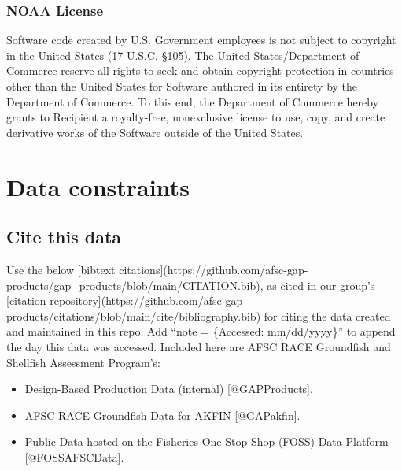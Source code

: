 \documentclass[
  letterpaper,
  oneside,
  open=any]{scrbook}
\begin{document}
\hypertarget{noaa-license}{%
\subsection{NOAA License}\label{noaa-license}}

Software code created by U.S. Government employees is not subject to
copyright in the United States (17 U.S.C. §105). The United
States/Department of Commerce reserve all rights to seek and obtain
copyright protection in countries other than the United States for
Software authored in its entirety by the Department of Commerce. To this
end, the Department of Commerce hereby grants to Recipient a
royalty-free, nonexclusive license to use, copy, and create derivative
works of the Software outside of the United States.

\hypertarget{data-constraints}{%
\chapter{Data constraints}\label{data-constraints}}

\hypertarget{cite-this-data-3}{%
\section{Cite this data}\label{cite-this-data-3}}

Use the below {[}bibtext
citations{]}(https://github.com/afsc-gap-products/gap\_products/blob/main/CITATION.bib),
as cited in our group's {[}citation
repository{]}(https://github.com/afsc-gap-products/citations/blob/main/cite/bibliography.bib)
for citing the data created and maintained in this repo. Add ``note =
\{Accessed: mm/dd/yyyy\}'' to append the day this data was accessed.
Included here are AFSC RACE Groundfish and Shellfish Assessment
Program's:

\begin{itemize}
\item
  Design-Based Production Data (internal) {[}@GAPProducts{]}.
\item
  AFSC RACE Groundfish Data for AKFIN {[}@GAPakfin{]}.
\item
  Public Data hosted on the Fisheries One Stop Shop (FOSS) Data Platform
  {[}@FOSSAFSCData{]}.
\end{itemize}
\end{document}
